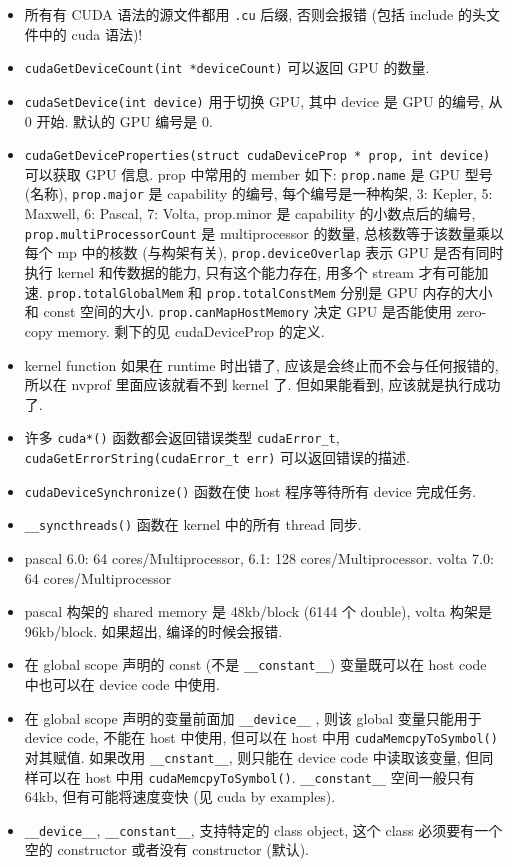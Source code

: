 
\begin{itemize}
\item 所有有 CUDA 语法的源文件都用 \verb`.cu` 后缀, 否则会报错 (包括 include 的头文件中的 cuda 语法)!
\item \verb`cudaGetDeviceCount(int *deviceCount)` 可以返回 GPU 的数量.
\item \verb`cudaSetDevice(int device)` 用于切换 GPU, 其中 device 是 GPU 的编号, 从 0 开始. 默认的 GPU 编号是 0.
\item \verb`cudaGetDeviceProperties(struct cudaDeviceProp * prop, int device)` 可以获取 GPU 信息. prop 中常用的 member 如下:
\verb`prop.name` 是 GPU 型号 (名称), \verb`prop.major` 是 capability 的编号, 每个编号是一种构架, 3: Kepler,  5: Maxwell, 6: Pascal, 7: Volta, prop.minor 是 capability 的小数点后的编号, \verb`prop.multiProcessorCount` 是 multiprocessor 的数量, 总核数等于该数量乘以每个 mp 中的核数 (与构架有关), \verb`prop.deviceOverlap` 表示 GPU 是否有同时执行 kernel 和传数据的能力, 只有这个能力存在, 用多个 stream 才有可能加速.
\verb`prop.totalGlobalMem` 和 \verb`prop.totalConstMem` 分别是 GPU 内存的大小和 const 空间的大小. \verb`prop.canMapHostMemory` 决定 GPU 是否能使用 zero-copy memory. 剩下的见 cudaDeviceProp 的定义.
\item kernel function 如果在 runtime 时出错了, 应该是会终止而不会与任何报错的, 所以在 nvprof 里面应该就看不到 kernel 了. 但如果能看到, 应该就是执行成功了.
\item 许多 \verb`cuda*()` 函数都会返回错误类型 \verb`cudaError_t`, \verb`cudaGetErrorString(cudaError_t err)` 可以返回错误的描述.
\item \verb`cudaDeviceSynchronize()` 函数在使 host 程序等待所有 device 完成任务.
\item \verb`__syncthreads()` 函数在 kernel 中的所有 thread 同步.
\item pascal 6.0: 64 cores/Multiprocessor, 6.1: 128 cores/Multiprocessor.   volta 7.0: 64 cores/Multiprocessor
\item pascal 构架的 shared memory 是 48kb/block (6144 个 double), volta 构架是 96kb/block. 如果超出, 编译的时候会报错.
\item 在 global scope 声明的 const (不是 \verb`__constant__`) 变量既可以在 host code 中也可以在 device code 中使用.
\item 在 global scope 声明的变量前面加 \verb`__device__` , 则该 global 变量只能用于 device code, 不能在 host 中使用, 但可以在 host 中用 \verb`cudaMemcpyToSymbol()` 对其赋值. 如果改用 \verb`__cnstant__`, 则只能在 device code 中读取该变量, 但同样可以在 host 中用 \verb`cudaMemcpyToSymbol()`. \verb`__constant__` 空间一般只有 64kb, 但有可能将速度变快 (见 cuda by examples).
\item \verb`__device__`, \verb`__constant__`, 支持特定的 class object, 这个 class 必须要有一个空的 constructor 或者没有 constructor (默认).


\end{itemize}

